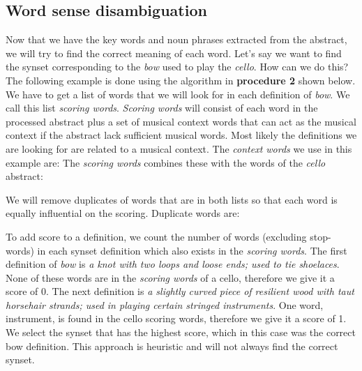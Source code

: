 
\subsection{Word sense disambiguation}
Now that we have the key words and noun phrases extracted from the abstract, we will try to find the correct meaning of each word. Let's say we want to find the synset corresponding to the \emph{bow} used to play the \emph{cello}. How can we do this? The following example is done using the algorithm in \textbf{procedure 2} shown below. We have to get a list of words that we will look for in each definition of \emph{bow}. We call this list \emph{scoring words}. \emph{Scoring words} will consist of each word in the processed abstract plus a set of musical context words that can act as the musical context if the abstract lack sufficient musical words. Most likely the definitions we are looking for are related to a musical context. The \emph{context words} we use in this example are:
\noindent{}
The \emph{scoring words} combines these with the words of the \emph{cello} abstract:

\noindent{}
We will remove duplicates of words that are in both lists so that each word is equally influential on the scoring. Duplicate words are:

\noindent{}

To add score to a definition, we count the number of words (excluding stop-words) in each synset definition which also exists in the \emph{scoring words}. The first definition of \emph{bow} is \emph{a knot with two loops and loose ends; used to tie shoelaces}. None of these words are in the \emph{scoring words} of a cello, therefore we give it a score of 0. The next definition is \emph{a slightly curved piece of resilient wood with taut horsehair strands; used in playing certain stringed instruments}. One word, instrument, is found in the cello scoring words, therefore we give it a score of 1. We select the synset that has the highest score, which in this case was the correct bow definition. This approach is heuristic and will not always find the correct synset.

